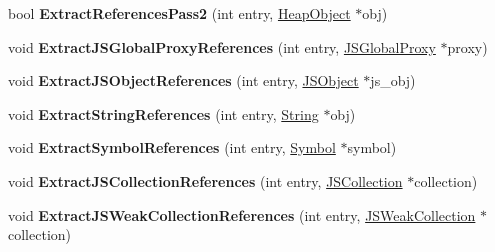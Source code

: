 \begin{DoxyCompactItemize}
\item 
bool {\bfseries Extract\+References\+Pass2} (int entry, \hyperlink{classv8_1_1internal_1_1_heap_object}{Heap\+Object} $\ast$obj)\hypertarget{classv8_1_1internal_1_1_v8_heap_explorer_a6941d1062d57bd8871602220176ace98}{}\label{classv8_1_1internal_1_1_v8_heap_explorer_a6941d1062d57bd8871602220176ace98}

\item 
void {\bfseries Extract\+J\+S\+Global\+Proxy\+References} (int entry, \hyperlink{classv8_1_1internal_1_1_j_s_global_proxy}{J\+S\+Global\+Proxy} $\ast$proxy)\hypertarget{classv8_1_1internal_1_1_v8_heap_explorer_a676e24c110b35929b98ad6f52f2852db}{}\label{classv8_1_1internal_1_1_v8_heap_explorer_a676e24c110b35929b98ad6f52f2852db}

\item 
void {\bfseries Extract\+J\+S\+Object\+References} (int entry, \hyperlink{classv8_1_1internal_1_1_j_s_object}{J\+S\+Object} $\ast$js\+\_\+obj)\hypertarget{classv8_1_1internal_1_1_v8_heap_explorer_a49a2c61c6485cd7ef4c2b68191bb5420}{}\label{classv8_1_1internal_1_1_v8_heap_explorer_a49a2c61c6485cd7ef4c2b68191bb5420}

\item 
void {\bfseries Extract\+String\+References} (int entry, \hyperlink{classv8_1_1internal_1_1_string}{String} $\ast$obj)\hypertarget{classv8_1_1internal_1_1_v8_heap_explorer_a7dbc930ca0b065b67db1d536ead928ad}{}\label{classv8_1_1internal_1_1_v8_heap_explorer_a7dbc930ca0b065b67db1d536ead928ad}

\item 
void {\bfseries Extract\+Symbol\+References} (int entry, \hyperlink{classv8_1_1internal_1_1_symbol}{Symbol} $\ast$symbol)\hypertarget{classv8_1_1internal_1_1_v8_heap_explorer_a9e2150dd94d3f9dabc2886bdbff2cbf1}{}\label{classv8_1_1internal_1_1_v8_heap_explorer_a9e2150dd94d3f9dabc2886bdbff2cbf1}

\item 
void {\bfseries Extract\+J\+S\+Collection\+References} (int entry, \hyperlink{classv8_1_1internal_1_1_j_s_collection}{J\+S\+Collection} $\ast$collection)\hypertarget{classv8_1_1internal_1_1_v8_heap_explorer_a65a298578e799f4e39b167f63504f975}{}\label{classv8_1_1internal_1_1_v8_heap_explorer_a65a298578e799f4e39b167f63504f975}

\item 
void {\bfseries Extract\+J\+S\+Weak\+Collection\+References} (int entry, \hyperlink{classv8_1_1internal_1_1_j_s_weak_collection}{J\+S\+Weak\+Collection} $\ast$collection)\hypertarget{classv8_1_1internal_1_1_v8_heap_explorer_a64ec6262273ef2719d137107f8554b36}{}\label{classv8_1_1internal_1_1_v8_heap_explorer_a64ec6262273ef2719d137107f8554b36}


\end{DoxyCompactItemize}
